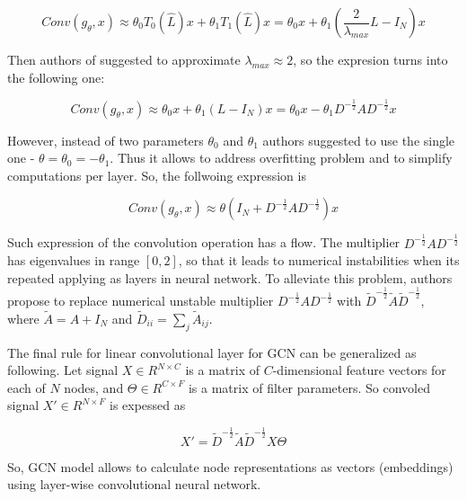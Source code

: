 \begin{equation}
    Conv(g_\theta,x) \approx {\theta}_0 T_0(\hat{L})x + {\theta}_1 T_1(\hat{L})x = {\theta}_0 x + {\theta}_1 (\frac{2}{\lambda_{max}}L-I_N)x
    \label{eq:gcn_conv_appr}
 \end{equation}

Then authors of \cite{GCN} suggested to approximate $\lambda_{max} \approx 2$, so the expresion turns into the following one:

\begin{equation}
    Conv(g_\theta,x) \approx {\theta}_0 x + {\theta}_1 (L-I_N)x = {\theta}_0 x - {\theta}_1 D^{-\frac{1}{2}}AD^{-\frac{1}{2}}x
    \label{eq:gcn_conv_appr2}
 \end{equation}

However, instead of two parameters $\theta_0$ and $\theta_1$ authors suggested to use the single one - $\theta = \theta_0 = -\theta_1$. Thus it allows to
address overfitting problem and to simplify computations per layer. So, the follwoing expression is


\begin{equation}
    Conv(g_\theta,x) \approx {\theta}(I_N + D^{-\frac{1}{2}}AD^{-\frac{1}{2}})x
    \label{eq:gcn_conv_appr3}
 \end{equation}

Such expression of the convolution operation has a flow. The multiplier  $D^{-\frac{1}{2}}AD^{-\frac{1}{2}}$ has eigenvalues in 
range $[0,2]$, so that it leads to numerical instabilities when its repeated applying as layers in neural network. To alleviate this
problem, authors propose to replace numerical unstable multiplier $D^{-\frac{1}{2}}AD^{-\frac{1}{2}}$
with $\tilde{D}^{-\frac{1}{2}}\tilde{A}\tilde{D}^{-\frac{1}{2}}$, where $\tilde{A}=A+I_N$ and $\tilde{D}_{ii}=\sum_{j}\tilde{A}_{ij}$.

The final rule for linear convolutional layer for GCN can be generalized as following. Let signal $X \in R^{N\times C}$ is a matrix of $C$-dimensional
feature vectors for each of $N$ nodes, and $\Theta \in R^{C \times F}$ is a matrix of filter parameters. So convoled signal $X' \in R^{N \times F}$ is 
expessed as 

\begin{equation}
    X' = \tilde{D}^{-\frac{1}{2}}\tilde{A}\tilde{D}^{-\frac{1}{2}}X\Theta
    \label{eq:final_gcn}
\end{equation}

So, GCN model allows to calculate node representations as vectors (embeddings) using layer-wise convolutional neural network.

